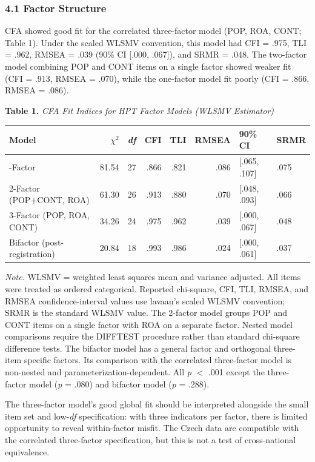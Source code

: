 \documentclass[
  12pt,
]{article}
\begin{document}
\hypertarget{factor-structure}{%
\subsubsection{4.1 Factor Structure}\label{factor-structure}}

CFA showed good fit for the correlated three-factor model (POP, ROA, CONT;
Table 1). Under the scaled WLSMV convention, this model had CFI = .975,
TLI = .962, RMSEA = .039 (90\% CI [.000, .067]), and SRMR = .048. The
two-factor model combining POP and CONT items on a single factor showed weaker
fit (CFI = .913, RMSEA = .070), while the one-factor model fit poorly
(CFI = .866, RMSEA = .086).

\textbf{Table 1.} \emph{CFA Fit Indices for HPT Factor Models (WLSMV Estimator)}

\begin{longtable}[]{@{}lrrrrrll@{}}
\toprule
Model & \(\chi^2\) & \emph{df} & CFI & TLI & RMSEA & 90\% CI & SRMR \\
\midrule
\endhead
\bottomrule
\endlastfoot
1-Factor & 81.54 & 27 & .866 & .821 & .086 & [.065, .107] & .075 \\
2-Factor (POP+CONT, ROA) & 61.30 & 26 & .913 & .880 & .070 & [.048, .093] & .066 \\
3-Factor (POP, ROA, CONT) & 34.26 & 24 & .975 & .962 & .039 & [.000, .067] & .048 \\
Bifactor (post-registration) & 20.84 & 18 & .993 & .986 & .024 & [.000, .061] & .037 \\
\end{longtable}

\emph{Note.} WLSMV = weighted least squares mean and variance adjusted. All
items were treated as ordered categorical. Reported chi-square, CFI, TLI,
RMSEA, and RMSEA confidence-interval values use lavaan's scaled WLSMV
convention; SRMR is the standard WLSMV value. The 2-factor model groups POP and
CONT items on a single factor with ROA on a separate factor. Nested model
comparisons require the DIFFTEST procedure rather than standard chi-square
difference tests. The bifactor model has a general factor and orthogonal
three-item specific factors. Its comparison with the correlated three-factor
model is non-nested and parameterization-dependent. All \emph{p} $<$ .001
except the three-factor model (\emph{p} = .080) and bifactor model
(\emph{p} = .288).

The three-factor model's good global fit should be interpreted alongside the
small item set and low-\emph{df} specification: with three indicators per
factor, there is limited opportunity to reveal within-factor misfit. The Czech
data are compatible with the correlated three-factor specification, but this is
not a test of cross-national equivalence.
\end{document}
